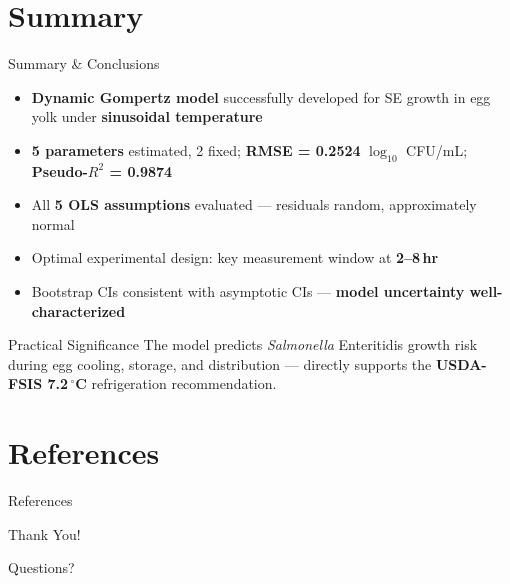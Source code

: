 \documentclass[10pt,aspectratio=169]{beamer}
\begin{document}
\section{Summary}
\begin{frame}{Summary \& Conclusions}
\begin{itemize}
    \item \textbf{Dynamic Gompertz model} successfully developed for SE growth in egg yolk under \textbf{sinusoidal temperature}
    \item \textbf{5 parameters} estimated, 2 fixed;\; \textbf{RMSE = 0.2524} $\log_{10}$ CFU/mL;\; \textbf{Pseudo-$R^2$ = 0.9874}
    \item All \textbf{5 OLS assumptions} evaluated --- residuals random, approximately normal
    \item Optimal experimental design: key measurement window at \textbf{2--8\,hr}
    \item Bootstrap CIs consistent with asymptotic CIs --- \textbf{model uncertainty well-characterized}
\end{itemize}
\vspace{0.4em}
\begin{block}{Practical Significance}
The model predicts \textit{Salmonella} Enteritidis growth risk during egg cooling, storage, and distribution --- directly supports the \textbf{USDA-FSIS 7.2\,$^\circ$C} refrigeration recommendation.
\end{block}
\end{frame}

\section{References}
\begin{frame}[allowframebreaks]{References}
\end{frame}

\begin{frame}
\centering
\vspace{2cm}
{\Huge Thank You!}
\vspace{1.5cm}

{\Large Questions?}
\end{frame}
\end{document}
